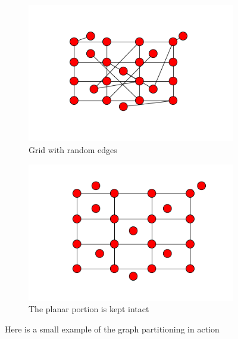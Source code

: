 \documentclass{article}
\begin{document}
\begin{figure}
\centering
\begin{subfigure}{.5\textwidth}
  \centering
  \includegraphics[width=.9\linewidth]{entiregraph.png}
  \caption{Grid with random edges}
  \label{fig:sub1}
\end{subfigure}%
\begin{subfigure}{.5\textwidth}
  \centering
  \includegraphics[width=.9\linewidth]{planargraph.png}
  \caption{The planar portion is kept intact}
  \label{fig:sub2}
\end{subfigure}
\caption{Here is a small example of the graph partitioning in action}
\label{fig:test}
\end{figure}
\end{document}
